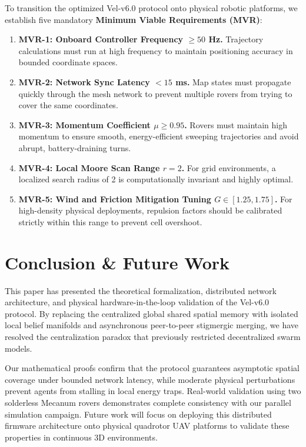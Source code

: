 \documentclass[letterpaper, 10pt, conference]{IEEEtran}
\begin{document}
To transition the optimized Vel-v6.0 protocol onto physical robotic platforms, we establish five mandatory \textbf{Minimum Viable Requirements (MVR)}:

\begin{enumerate}
    \item \textbf{MVR-1: Onboard Controller Frequency $\geq 50$ Hz.} Trajectory calculations must run at high frequency to maintain positioning accuracy in bounded coordinate spaces.
    \item \textbf{MVR-2: Network Sync Latency $< 15$ ms.} Map states must propagate quickly through the mesh network to prevent multiple rovers from trying to cover the same coordinates.
    \item \textbf{MVR-3: Momentum Coefficient $\mu \geq 0.95$.} Rovers must maintain high momentum to ensure smooth, energy-efficient sweeping trajectories and avoid abrupt, battery-draining turns.
    \item \textbf{MVR-4: Local Moore Scan Range $r = 2$.} For grid environments, a localized search radius of 2 is computationally invariant and highly optimal.
    \item \textbf{MVR-5: Wind and Friction Mitigation Tuning $G \in [1.25, 1.75]$.} For high-density physical deployments, repulsion factors should be calibrated strictly within this range to prevent cell overshoot.
\end{enumerate}

\section{Conclusion \& Future Work}
\label{sec:conclusion}

This paper has presented the theoretical formalization, distributed network architecture, and physical hardware-in-the-loop validation of the Vel-v6.0 protocol. By replacing the centralized global shared spatial memory with isolated local belief manifolds and asynchronous peer-to-peer stigmergic merging, we have resolved the centralization paradox that previously restricted decentralized swarm models.

Our mathematical proofs confirm that the protocol guarantees asymptotic spatial coverage under bounded network latency, while moderate physical perturbations prevent agents from stalling in local energy traps. Real-world validation using two solderless Mecanum rovers demonstrates complete consistency with our parallel simulation campaign. Future work will focus on deploying this distributed firmware architecture onto physical quadrotor UAV platforms to validate these properties in continuous 3D environments.
\end{document}
